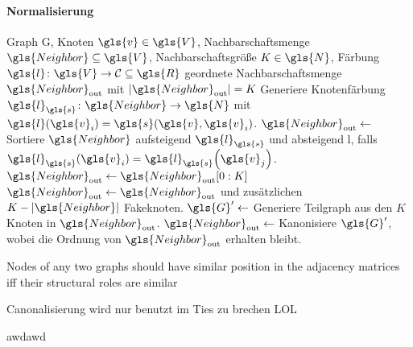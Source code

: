 \paragraph{Normalisierung}
\label{normalisierung}

\begin{algorithm}[t]
\centering
\begin{algorithmic}
  \REQUIRE{} Graph \gls{G}, Knoten $\gls{v} \in \gls{V}$, Nachbarschaftsmenge $\gls{Neighbor} \subseteq \gls{V}$, Nachbarschaftsgröße $K \in \gls{N}$, Färbung $\gls{l} \colon \gls{V} \to \mathcal{C} \subseteq \gls{R}$
  \ENSURE{} geordnete Nachbarschaftsmenge $\gls{Neighbor}_{\mathrm{out}}$ mit $\left|\gls{Neighbor}_{\mathrm{out}}\right| = K$
  \STATE{} Generiere Knotenfärbung $\gls{l}_{\gls{s}} \colon \gls{Neighbor} \to \gls{N}$ mit $\gls{l}\left(\gls{v}_i\right) = \gls{s}\left(\gls{v}, \gls{v}_i\right)$.
  \STATE{} $\gls{Neighbor}_{\mathrm{out}} \leftarrow$ Sortiere $\gls{Neighbor}$ aufsteigend \bzgl{} $\gls{l}_{\gls{s}}$ und absteigend \bzgl{} \gls{l}, falls $\gls{l}_{\gls{s}}\left(\gls{v}_i\right) = \gls{l}_{\gls{s}}\left(\gls{v}_j\right)$.
    \STATE{} $\gls{Neighbor}_{\mathrm{out}} \leftarrow \gls{Neighbor}_{\mathrm{out}}\left[0:K\right]$
  \ENDIF{}
    \STATE{} $\gls{Neighbor}_{\mathrm{out}} \leftarrow \gls{Neighbor}_{\mathrm{out}}$ und zusätzlichen $K - \left|\gls{Neighbor}\right|$ Fakeknoten.
  \ENDIF{}
  \STATE{} $\gls{G}^{\prime} \leftarrow$ Generiere Teilgraph aus den $K$ Knoten in $\gls{Neighbor}_{\mathrm{out}}$.
  \STATE{} $\gls{Neighbor}_{\mathrm{out}} \leftarrow$ Kanonisiere $\gls{G}^{\prime}$, wobei die Ordnung von $\gls{Neighbor}_{\mathrm{out}}$ erhalten bleibt.
\end{algorithmic}
\caption[Normalisierungsschritt der räumlichen Faltung]{}
\label{alg:normalisierung}
\end{algorithm}


Nodes of any two graphs should have similar position in the
adjacency matrices iff their structural roles are similar

Canonalisierung wird nur benutzt im Ties zu brechen  LOL

awdawd

